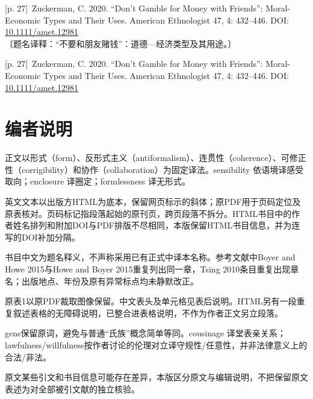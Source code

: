 \documentclass[10pt,a4paper]{article}
\begin{document}
\noindent\begin{minipage}{\textwidth}\begin{minipage}[t]{\dimexpr.5\textwidth-4mm\relax}\noindent\begin{minipage}[t]{\linewidth}{\scriptsize\color{gray} [p. 27]}\ Zuckerman, C. 2020. “Don’t Gamble for Money with Friends”: Moral-Economic Types and Their Uses. American Ethnologist 47, 4: 432–446. DOI: \url{10.1111/amet.12981} 〔题名译释：“不要和朋友赌钱”：道德—经济类型及其用途。〕\par\end{minipage}\par\end{minipage}\hfill\begin{minipage}[t]{\dimexpr.5\textwidth-4mm\relax}\noindent\begin{minipage}[t]{\linewidth}{\scriptsize\color{gray} [p. 27]}\ Zuckerman, C. 2020. “Don’t Gamble for Money with Friends”: Moral-Economic Types and Their Uses. American Ethnologist 47, 4: 432–446. DOI: \url{10.1111/amet.12981}\par\end{minipage}\par\end{minipage}\end{minipage}\par
\section*{编者说明}
正文以形式（form）、反形式主义（antiformalism）、连贯性（coherence）、可修正性（corrigibility）和协作（collaboration）为固定译法。sensibility 依语境译感受取向；enclosure 译圈定；formlessness 译无形式。\par
英文文本以出版方HTML为底本，保留网页标示的斜体；原PDF用于页码定位及原表核对。页码标记指段落起始的原刊页，跨页段落不拆分。HTML书目中的作者姓名排列和附加DOI与PDF排版不尽相同，本版保留HTML书目信息，并为连写的DOI补加分隔。\par
书目中文为题名释义，不声称采用已有正式中译本名称。参考文献中Boyer and Howe 2015与Howe and Boyer 2015重复列出同一章，Tsing 2010条目重复出现章名；出版地点、年份及原有异常标点均未静默改正。\par
原表1以原PDF裁取图像保留。中文表头及单元格见表后说明。HTML另有一段重复叙述表格的无障碍说明，已整合进表格说明，不作为作者正文另立段落。\par
gens保留原词，避免与普通“氏族”概念简单等同。cousinage 译堂表亲关系；lawfulness/willfulness按作者讨论的伦理对立译守规性/任意性，并非法律意义上的合法/非法。\par
原文某些引文和书目信息可能存在差异，本版区分原文与编辑说明，不把保留原文表述为对全部被引文献的独立核验。\par
\end{document}

